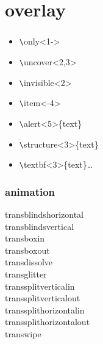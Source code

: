 \documentclass[11pt]{beamer}
\begin{document}
\section{overlay}
\begin{frame}[containsverbatim]
\frametitle{\secname}
\begin{itemize}
  \item \verb|\|only<1->
  \item \verb|\|uncover<2,3>
  \item \verb|\|invisible<2>
  \item \verb|\|item<-4>
  \item \verb|\|alert<5>\{text\}	
  \item \verb|\|structure<3>\{text\}
  \item \verb|\|textbf<3>\{text\}\ldots
\end{itemize}
\end{frame}


\begin{frame}
\frametitle{animation}
  \transblindshorizontal transblindshorizontal\\
  \transblindsvertical transblindsvertical\\
  \transboxin transboxin\\
  \transboxout transboxout\\
  \transdissolve transdissolve\\
  \transglitter[direction=90] transglitter\\
  \transsplitverticalin transsplitverticalin\\
  \transsplitverticalout transsplitverticalout\\
  \transsplithorizontalin transsplithorizontalin\\
  \transsplithorizontalout transsplithorizontalout\\
  \transwipe transwipe\\

\end{frame}
\end{document}
